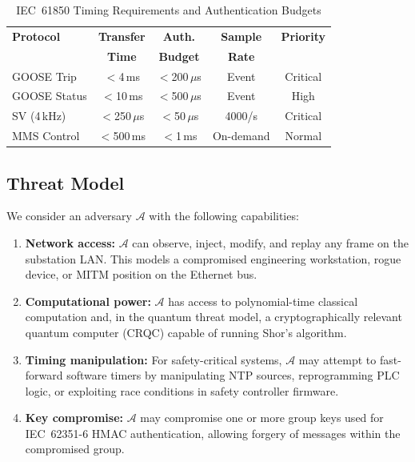 \documentclass[conference,10pt]{IEEEtran}
\newcommand{\GOOSE}{\textsf{GOOSE}}
\newcommand{\SV}{\textsf{SV}}
\newcommand{\MMS}{\textsf{MMS}}
\begin{document}
\begin{table}[t]
\centering
\caption{IEC~61850 Timing Requirements and Authentication Budgets}
\label{tab:timing_requirements}
\begin{tabular}{@{}lcccc@{}}
\toprule
\textbf{Protocol} & \textbf{Transfer} & \textbf{Auth.} & \textbf{Sample} & \textbf{Priority} \\
 & \textbf{Time} & \textbf{Budget} & \textbf{Rate} & \\
\midrule
\GOOSE{} Trip  & $<$4\,ms  & $<$200\,$\mu$s & Event & Critical \\
\GOOSE{} Status & $<$10\,ms & $<$500\,$\mu$s & Event & High \\
\SV{} (4\,kHz)  & $<$250\,$\mu$s & $<$50\,$\mu$s & 4000/s & Critical \\
\MMS{} Control   & $<$500\,ms & $<$1\,ms & On-demand & Normal \\
\bottomrule
\end{tabular}
\end{table}

\subsection{Threat Model}

We consider an adversary $\mathcal{A}$ with the following capabilities:

\begin{enumerate}
  \item \textbf{Network access:} $\mathcal{A}$ can observe, inject, modify, and replay any frame on the substation LAN. This models a compromised engineering workstation, rogue device, or MITM position on the Ethernet bus.

  \item \textbf{Computational power:} $\mathcal{A}$ has access to polynomial-time classical computation and, in the quantum threat model, a cryptographically relevant quantum computer (CRQC) capable of running Shor's algorithm.

  \item \textbf{Timing manipulation:} For safety-critical systems, $\mathcal{A}$ may attempt to fast-forward software timers by manipulating NTP sources, reprogramming PLC logic, or exploiting race conditions in safety controller firmware.

  \item \textbf{Key compromise:} $\mathcal{A}$ may compromise one or more group keys used for IEC~62351-6 HMAC authentication, allowing forgery of messages within the compromised group.
\end{enumerate}
\end{document}
